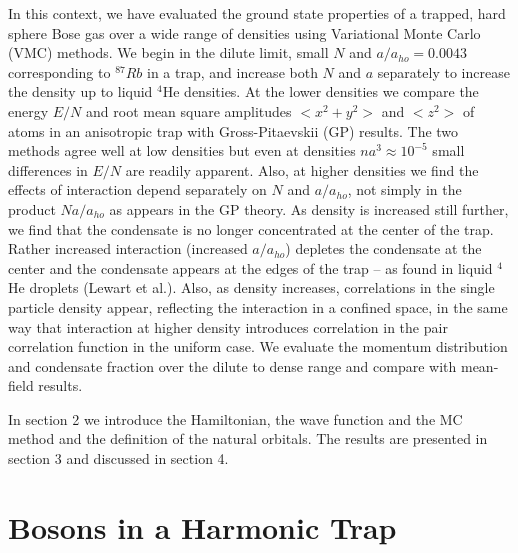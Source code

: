 \documentclass[aps,pra,twocolumn,groupedaddress]{revtex4}
\begin{document}
In this context, we have evaluated the ground state properties of
a trapped, hard sphere Bose gas over a wide range of densities
using Variational Monte Carlo (VMC) methods. We begin in the
dilute limit, small $N$ and $a/a_{ho}=0.0043$ corresponding to
$^{87}Rb$ in a trap, and increase both $N$ and $a$ separately to
increase the density up to liquid $^4$He densities. At the lower
densities we compare the energy $E/N$ and root mean square
amplitudes $<x^2+y^2>$ and $<z^2>$ of atoms in an anisotropic trap
with Gross-Pitaevskii (GP) results\cite{dalfovo96}. The two
methods agree well at low densities but even at densities $na^3
\approx 10^{-5}$ small differences in $E/N$ are readily apparent. 
Also, at higher densities we find the effects of interaction depend
separately on $N$ and $a/a_{ho}$, not simply in the product 
$Na/a_{ho}$ as appears in the GP theory. As density is increased 
still further,
we find that the condensate is no longer concentrated at the
center of the trap. Rather increased interaction (increased $a/a_{ho}$)
depletes the condensate at the center and the condensate appears
at the edges of the trap -- as found in liquid $^4$He droplets
(Lewart et al.\cite{lewart88}). Also, as density increases,
correlations in the single particle density appear, reflecting the
interaction in a confined space, in the same way that interaction
at higher density introduces correlation in the pair correlation
function in the uniform case. We evaluate the momentum
distribution and condensate fraction over the dilute to dense
range and compare with mean-field results\cite{javanainen96}.

In section 2 we introduce the Hamiltonian, the wave function and the MC method
and the definition of the natural orbitals.  The results are presented in 
section 3 and discussed in section 4.

\section{Bosons in a Harmonic Trap}
\end{document}
